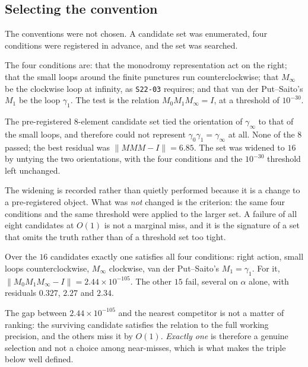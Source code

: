 \subsection{Selecting the convention}\label{ssec:selection}

The conventions were not chosen. A candidate set was enumerated, four
conditions were registered in advance, and the set was searched.

The four conditions are: that the monodromy representation act on the right;
that the small loops around the finite punctures run counterclockwise; that
$M_\infty$ be the clockwise loop at infinity, as \texttt{S22-03} requires; and
that van der Put--Saito's $M_1$ be the loop $\gamma_1$. The test is the
relation $M_0M_1M_\infty=I$, at a threshold of $10^{-30}$.

\begin{remark}
The pre-registered $8$-element candidate set tied the orientation of
$\gamma_\infty$ to that of the small loops, and therefore could not represent
$\gamma_0\gamma_1=\gamma_\infty$ at all. None of the $8$ passed; the best
residual was $\|MMM-I\|=6.85$. The set was widened to $16$ by untying the two
orientations, with the four conditions and the $10^{-30}$ threshold left
unchanged.
\end{remark}

The widening is recorded rather than quietly performed because it is a change
to a pre-registered object. What was \emph{not} changed is the criterion: the
same four conditions and the same threshold were applied to the larger set. A
failure of all eight candidates at $O(1)$ is not a marginal miss, and it is the
signature of a set that omits the truth rather than of a threshold set too
tight.

\begin{remark}
Over the $16$ candidates exactly one satisfies all four conditions: right
action, small loops counterclockwise, $M_\infty$ clockwise, van der
Put--Saito's $M_1=\gamma_1$. For it, $\|M_0M_1M_\infty-I\|=2.44\times10^{-105}$.
The other $15$ fail, several on $\alpha$ alone, with residuals $0.327$, $2.27$
and $2.34$.
\end{remark}

The gap between $2.44\times10^{-105}$ and the nearest competitor is not a
matter of ranking: the surviving candidate satisfies the relation to the full
working precision, and the others miss it by $O(1)$. \emph{Exactly one} is
therefore a genuine selection and not a choice among near-misses, which is what
makes the triple below well defined.

